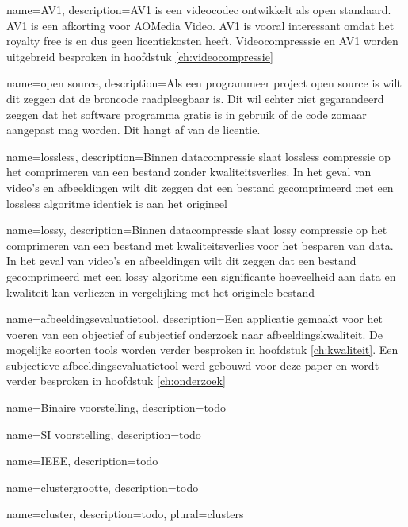 {
	name={AV1},
	description={AV1 is een videocodec ontwikkelt als open standaard. AV1 is een afkorting voor AOMedia Video. AV1 is vooral interessant omdat het royalty free is en dus geen licentiekosten heeft. Videocompresssie en AV1 worden uitgebreid besproken in hoofdstuk \ref{ch:videocompressie}}
}

{
	name={open source},
	description={Als een programmeer project open source is wilt dit zeggen dat de broncode raadpleegbaar is. Dit wil echter niet gegarandeerd zeggen dat het software programma gratis is in gebruik of de code zomaar aangepast mag worden. Dit hangt af van de licentie.}
}

{
	name={lossless},
	description={Binnen datacompressie slaat lossless compressie op het comprimeren van een bestand zonder kwaliteitsverlies. In het geval van video's en afbeeldingen wilt dit zeggen dat een bestand gecomprimeerd met een lossless algoritme identiek is aan het origineel}
}

{
	name={lossy},
	description={Binnen datacompressie slaat lossy compressie op het comprimeren van een bestand met kwaliteitsverlies voor het besparen van data. In het geval van video's en afbeeldingen wilt dit zeggen dat een bestand gecomprimeerd met een lossy algoritme een significante hoeveelheid aan data en kwaliteit kan verliezen in vergelijking met het originele bestand}
}

{
	name={afbeeldingsevaluatietool},
	description={Een applicatie gemaakt voor het voeren van een objectief of subjectief onderzoek naar afbeeldingskwaliteit. De mogelijke soorten tools worden verder besproken in hoofdstuk \ref{ch:kwaliteit}. Een subjectieve afbeeldingsevaluatietool werd gebouwd voor deze paper en wordt verder besproken in hoofdstuk \ref{ch:onderzoek}}
}

{
	name={Binaire voorstelling},
	description={todo}
}

{
	name={SI voorstelling},
	description={todo}
}

{
	name={IEEE},
	description={todo}
}

{
	name={clustergrootte},
	description={todo}
}

{
	name={cluster},
	description={todo},
	plural={clusters}
}

